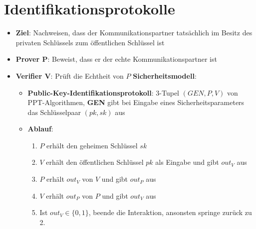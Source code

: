 \section{Identifikationsprotokolle}%
\label{idprot:sec:identifikationsprotokolle}

\begin{itemize}
	\item \textbf{Ziel}: Nachweisen, dass der Kommunikationspartner tatsächlich im Besitz des privaten Schlüssels zum öffentlichen Schlüssel ist
	\item \textbf{Prover P}: Beweist, dass er der echte Kommunikationspartner ist
	\item \textbf{Verifier V}: Prüft die Echtheit von $P$
	\textbf{Sicherheitsmodell}:
	\begin{itemize}
		\item \textbf{Public-Key-Identifikationsprotokoll}: 3-Tupel $(GEN, P, V)$ von PPT-Algorithmen, \textbf{GEN} gibt bei Eingabe eines Sicherheitsparameters das Schlüsselpaar $(pk, sk)$ aus
		\item \textbf{Ablauf}:
		\begin{enumerate}
			\item $P$ erhält den geheimen Schlüssel $sk$
			\item $V$ erhält den öffentlichen Schlüssel $pk$ als Eingabe und gibt $out_V$ aus
			\item $P$ erhält $out_V$ von $V$ und gibt $out_P$ aus
			\item $V$ erhält $out_P$ von $P$ und gibt $out_V$ aus
			\item Ist $out_V \in \{0, 1\}$, beende die Interaktion, ansonsten springe zurück zu 2.
		\end{enumerate}
	\end{itemize}
\end{itemize}